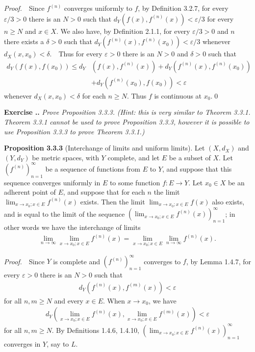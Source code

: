 \documentclass{book}
\newcommand{\pff}{\vspace{.25em}\noindent\emph{Proof.}~~}
\newcommand{\titl}[1]{\noindent\textbf{#1}}
\newcounter{Exercise}[section]
\renewcommand{\theExercise}{\thesection.\arabic{Exercise}.}
\newcommand{\new}{\vspace{1.5em}\noindent\textbf{Exercise \stepcounter{Exercise}\textbf{\theExercise}} }
\begin{document}
\pff Since $f^{(n)}$ converges uniformly to $f$, by Definition 3.2.7, for every $\varepsilon/3>0$ there is an $N>0$ such that $d_Y(f(x),f^{(n)}(x))<\varepsilon/3$ for every $n\geq N$ and $x\in X$. We also have, by Definition 2.1.1, for every $\varepsilon/3>0$ and $n$ there exists a $\delta>0$ such that $d_Y(f^{(n)}(x),f^{(n)}(x_0))<\varepsilon/3$ whenever $d_X(x,x_0)<\delta$.　Thus for every $\varepsilon>0$ there is an $N>0$ and $\delta>0$ such that
    \begin{align*}
        d_Y(f(x),f(x_0))\leq d_Y&(f(x),f^{(n)}(x))+d_Y(f^{(n)}(x),f^{(n)}(x_0))\\
        &+d_Y(f^{(n)}(x_0),f(x_0))<\varepsilon
    \end{align*}
whenever $d_X(x,x_0)<\delta$ for each $n\geq N$. Thus $f$ is continuous at $x_0$.\qed

\new\emph{Prove Proposition 3.3.3. (Hint: this is very similar to Theorem 3.3.1. Theorem 3.3.1 cannot be used to prove Proposition 3.3.3, however it is possible to use Proposition 3.3.3 to prove Theorem 3.3.1.)}

\begin{framed}
\titl{Proposition 3.3.3} (Interchange of limits and uniform limits). Let $(X,d_X)$ and $(Y,d_Y)$ be metric spaces, with $Y$ complete, and let $E$ be a subset of $X$. Let $(f^{(n)})_{n=1}^{\infty}$ be a sequence of functions from $E$ to $Y$, and suppose that this sequence converges uniformly in $E$ to some function $f:E\to Y$. Let $x_0\in X$ be an adherent point of $E$, and suppose that for each $n$ the limit $\lim_{x\to x_0;x\in E}f^{(n)}(x)$ exists. Then the limit $\lim_{x\to x_0;x\in E}f(x)$ also exists, and is equal to the limit of the sequence $(\lim_{x\to x_0;x\in E}f^{(n)}(x))_{n=1}^{\infty}$; in other words we have the interchange of limits
    \begin{align*}
        \lim_{n\to\infty}\lim_{x\to x_0;x\in E}f^{(n)}(x)=\lim_{x\to x_0;x\in E}\lim_{n\to\infty}f^{(n)}(x).
    \end{align*}
\end{framed}

\pff Since $Y$ is complete and $(f^{(n)})_{n=1}^{\infty}$ converges to $f$, by Lemma 1.4.7, for every $\varepsilon>0$ there is an $N>0$ such that
    \begin{align*}
        d_Y(f^{(n)}(x),f^{(m)}(x))<\varepsilon
    \end{align*}
for all $n,m\geq N$ and every $x\in E$. When $x\to x_0$, we have
    \begin{align*}
        d_Y(\lim_{x\to x_0;x\in E}f^{(n)}(x),\lim_{x\to x_0;x\in E}f^{(m)}(x))<\varepsilon
    \end{align*}
for all $n,m\geq N$. By Definitions 1.4.6, 1.4.10, $(\lim_{x\to x_0;x\in E}f^{(n)}(x))_{n=1}^{\infty}$ converges in $Y$, say to $L$.
\end{document}

